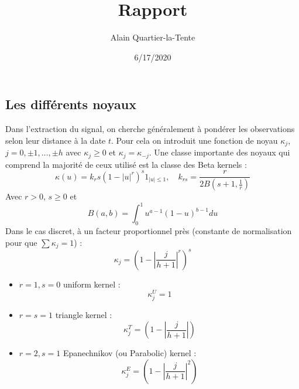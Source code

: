 \documentclass[
  12pt,
  french]{article}
\title{Rapport}
\author{Alain Quartier-la-Tente}
\date{6/17/2020}
\begin{document}
\maketitle

{
\setcounter{tocdepth}{2}
\tableofcontents
}
\hypertarget{les-diffuxe9rents-noyaux}{%
\subsection{Les différents noyaux}\label{les-diffuxe9rents-noyaux}}

Dans l'extraction du signal, on cherche généralement à pondérer les observations selon leur distance à la date \(t\).
Pour cela on introduit une fonction de noyau \(\kappa_j\), \(j=0,\pm1,\dots,\pm h\) avec \(\kappa_j \geq0\) et \(\kappa_j=\kappa_{-j}\).
Une classe importante des noyaux qui comprend la majorité de ceux utilisé est la classe des Beta kernels :
\[
\kappa(u)=k_rs\left(1-\lvert u\rvert^r
\right)^s
1_{\lvert u\rvert\leq 1}
,\quad k_{rs}=\frac{r}{
2B\left(s+1,\frac 1 r\right)
}
\]
Avec \(r>0\), \(s\geq 0\) et
\[
B(a,b)=\int_0^1u^{a-1}(1-u)^{b-1}du
\]
Dans le cas discret, à un facteur proportionnel près (constante de normalisation pour que \(\sum\kappa_j=1\)) :
\[
\kappa_j = \left(
  1-
  \left\lvert
  \frac j {h+1}
  \right\lvert^r
\right)^s
\]

\begin{multicols}{2}
\begin{itemize}
\item $r=1,s=0$ uniform kernel : 
$$\kappa_j^U=1$$

\item $r=s=1$ triangle kernel :
$$\kappa_j^T=\left(
  1-
  \left\lvert
  \frac j {h+1}
  \right\lvert
\right)$$

\item $r=2,s=1$  Epanechnikov (ou Parabolic) kernel :
$$\kappa_j^E=\left(
  1-
  \left\lvert
  \frac j {h+1}
  \right\lvert^2
\right)$$
\end{itemize}
\end{multicols}
\end{document}
